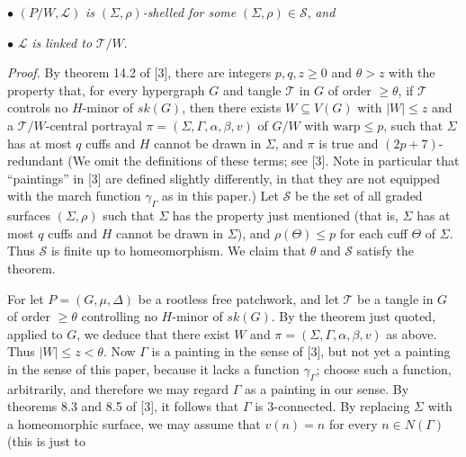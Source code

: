 \hspace*{12pt}$\bullet$ $(P/W, \mathcal{L})$ \textit{is} $(\Sigma, \rho)$\textit{-shelled for some} $(\Sigma, \rho) \in \mathcal{S}$, \textit{and}

\hspace*{12pt}$\bullet$ $\mathcal{L}$ \textit{is linked to} $\mathcal{T}/W$.

\textit{Proof.} By theorem 14.2 of [3], there are integers $p, q, z \ge 0$ and $\theta > z$ with the property that, for every hypergraph $G$ and tangle $\mathcal{T}$ in $G$ of order $\ge \theta$, if $\mathcal{T}$ controls no $H$-minor of $sk(G)$, then there exists $W \subseteq V(G)$ with $|W| \le z$ and a $\mathcal{T}/W$-central portrayal $\pi = (\Sigma, \Gamma, \alpha, \beta, v)$ of $G/W$ with $\text{warp} \le p$, such that $\Sigma$ has at most $q$ cuffs and $H$ cannot be drawn in $\Sigma$, and $\pi$ is true and $(2p + 7)$-redundant (We omit the definitions of these terms; see [3]. Note in particular that ``paintings'' in [3] are defined slightly differently, in that they are not equipped with the march function $\gamma_\Gamma$ as in this paper.) Let $\mathcal{S}$ be the set of all graded surfaces $(\Sigma, \rho)$ such that $\Sigma$ has the property just mentioned (that is, $\Sigma$ has at most $q$ cuffs and $H$ cannot be drawn in $\Sigma$), and $\rho(\Theta) \le p$ for each cuff $\Theta$ of $\Sigma$. Thus $\mathcal{S}$ is finite up to homeomorphism. We claim that $\theta$ and $\mathcal{S}$ satisfy the theorem.

For let $P = (G, \mu, \Delta)$ be a rootless free patchwork, and let $\mathcal{T}$ be a tangle in $G$ of order $\ge \theta$ controlling no $H$-minor of $sk(G)$. By the theorem just quoted, applied to $G$, we deduce that there exist $W$ and $\pi = (\Sigma, \Gamma, \alpha, \beta, v)$ as above. Thus $|W| \le z < \theta$. Now $\Gamma$ is a painting in the sense of [3], but not yet a painting in the sense of this paper, because it lacks a function $\gamma_\Gamma$; choose such a function, arbitrarily, and therefore we may regard $\Gamma$ as a painting in our sense. By theorems 8.3 and 8.5 of [3], it follows that $\Gamma$ is 3-connected. By replacing $\Sigma$ with a homeomorphic surface, we may assume that $v(n) = n$ for every $n \in N(\Gamma)$ (this is just to
